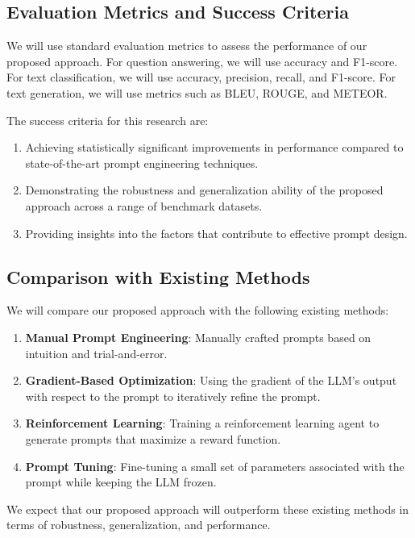 \documentclass{article}
\begin{document}
\subsection{Evaluation Metrics and Success Criteria}

We will use standard evaluation metrics to assess the performance of our proposed approach. For question answering, we will use accuracy and F1-score. For text classification, we will use accuracy, precision, recall, and F1-score. For text generation, we will use metrics such as BLEU, ROUGE, and METEOR.

The success criteria for this research are:

\begin{enumerate}
    \item Achieving statistically significant improvements in performance compared to state-of-the-art prompt engineering techniques.
    \item Demonstrating the robustness and generalization ability of the proposed approach across a range of benchmark datasets.
    \item Providing insights into the factors that contribute to effective prompt design.
\end{enumerate}

\subsection{Comparison with Existing Methods}

We will compare our proposed approach with the following existing methods:

\begin{enumerate}
    \item \textbf{Manual Prompt Engineering}: Manually crafted prompts based on intuition and trial-and-error.
    \item \textbf{Gradient-Based Optimization}: Using the gradient of the LLM's output with respect to the prompt to iteratively refine the prompt.
    \item \textbf{Reinforcement Learning}: Training a reinforcement learning agent to generate prompts that maximize a reward function.
    \item \textbf{Prompt Tuning}: Fine-tuning a small set of parameters associated with the prompt while keeping the LLM frozen.
\end{enumerate}

We expect that our proposed approach will outperform these existing methods in terms of robustness, generalization, and performance.
\end{document}
